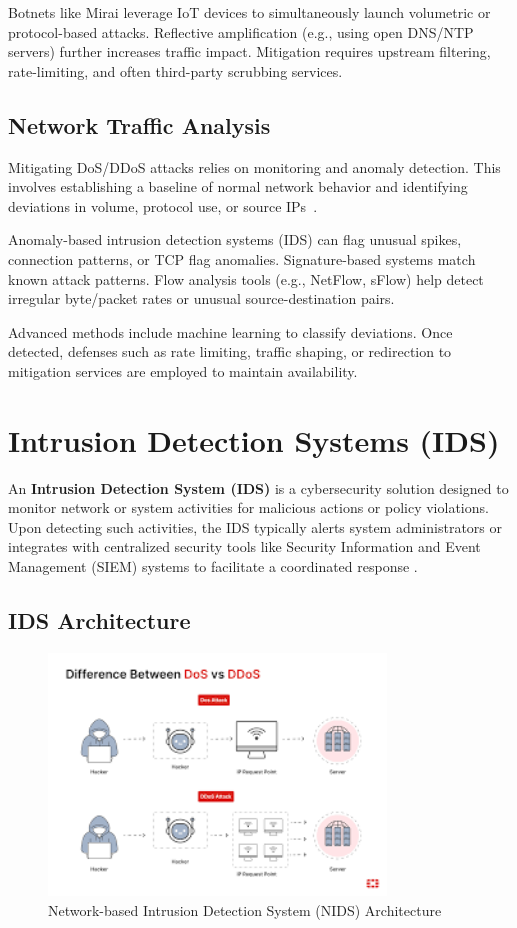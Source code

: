 \documentclass[12pt]{report}
\begin{document}
Botnets like Mirai leverage IoT devices to simultaneously launch volumetric or protocol-based attacks. Reflective amplification (e.g., using open DNS/NTP servers) further increases traffic impact. Mitigation requires upstream filtering, rate-limiting, and often third-party scrubbing services.

\subsection{Network Traffic Analysis}
Mitigating DoS/DDoS attacks relies on monitoring and anomaly detection. This involves establishing a baseline of normal network behavior and identifying deviations in volume, protocol use, or source IPs~\cite{fidelis_dos, mdpi_dos}.

Anomaly-based intrusion detection systems (IDS) can flag unusual spikes, connection patterns, or TCP flag anomalies. Signature-based systems match known attack patterns. Flow analysis tools (e.g., NetFlow, sFlow) help detect irregular byte/packet rates or unusual source-destination pairs.

Advanced methods include machine learning to classify deviations. Once detected, defenses such as rate limiting, traffic shaping, or redirection to mitigation services are employed to maintain availability.

\section{Intrusion Detection Systems (IDS)}
An \textbf{Intrusion Detection System (IDS)} is a cybersecurity solution designed to monitor network or system activities for malicious actions or policy violations. Upon detecting such activities, the IDS typically alerts system administrators or integrates with centralized security tools like Security Information and Event Management (SIEM) systems to facilitate a coordinated response \cite{ibm_ids}.

\subsection{IDS Architecture}
\begin{figure}[H]
    \centering
    \includegraphics[width=0.8\textwidth]{images/ids-arch-diagram.png}
    \caption{Network-based Intrusion Detection System (NIDS) Architecture}
    \label{fig:nids-architecture}
\end{figure}
\end{document}
